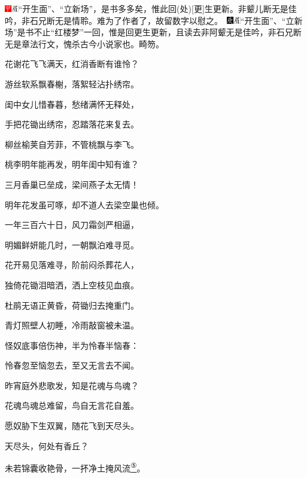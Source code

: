 {{\includegraphics[width=3mm]{../Images/00002}\includegraphics[width=3mm]{../Images/00010}\footnotesize \kaishu ``开生面''、``立新场''，是书多多矣，惟此回{(处)}{[}更{]}生更新。非颦儿断无是佳吟，非石兄断无是情聆。难为了作者了，故留数字以慰之。　\includegraphics[width=3mm]{../Images/00004}\includegraphics[width=3mm]{../Images/00010}\footnotesize \kaishu ``开生面''、``立新场''是书不止``红楼梦''一回，惟是回更生更新，且读去非阿颦无是佳吟，非石兄断无是章法行文，愧杀古今小说家也。畸笏。}}

花谢花飞飞满天，红消香断有谁怜？

游丝软系飘春榭，落絮轻沾扑绣帘。

闺中女儿惜春暮，愁绪满怀无释处，

手把花锄出绣帘，忍踏落花来复去。

柳丝榆荚自芳菲，不管桃飘与李飞。

桃李明年能再发，明年闺中知有谁？

三月香巢已垒成，梁间燕子太无情！

明年花发虽可啄，却不道人去梁空巢也倾。

一年三百六十日，风刀霜剑严相逼，

明媚鲜妍能几时，一朝飘泊难寻觅。

花开易见落难寻，阶前闷杀葬花人，

独倚花锄泪暗洒，洒上空枝见血痕。

杜鹃无语正黄昏，荷锄归去掩重门。

青灯照壁人初睡，冷雨敲窗被未温。

怪奴底事倍伤神，半为怜春半恼春：

怜春忽至恼忽去，至又无言去不闻。

昨宵庭外悲歌发，知是花魂与鸟魂？

花魂鸟魂总难留，鸟自无言花自羞。

愿奴胁下生双翼，随花飞到天尽头。

天尽头，何处有香丘？

未若锦囊收艳骨，一抔净土掩风流\href{../Text/part0031_split_000.html\#lnkback_5_a}{\textsuperscript{⑤}}。

